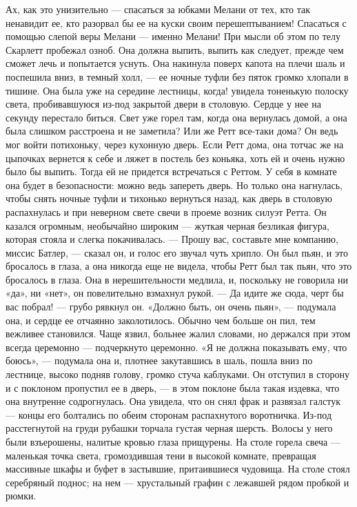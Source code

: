 Ах, как это унизительно — спасаться за юбками Мелани от тех, кто так ненавидит ее, кто разорвал бы ее на куски своим перешептыванием! Спасаться с помощью слепой веры Мелани — именно Мелани!
При мысли об этом по телу Скарлетт пробежал озноб. Она должна выпить, выпить как следует, прежде чем сможет лечь и попытается уснуть. Она накинула поверх капота на плечи шаль и поспешила вниз, в темный холл, — ее ночные туфли без пяток громко хлопали в тишине. Она была уже на середине лестницы, когда! увидела тоненькую полоску света, пробивавшуюся из-под закрытой двери в столовую. Сердце у нее на секунду перестало биться. Свет уже горел там, когда она вернулась домой, а она была слишком расстроена и не заметила? Или же Ретт все-таки дома? Он ведь мог войти потихоньку, через кухонную дверь. Если Ретт дома, она тотчас же на цыпочках вернется к себе и ляжет в постель без коньяка, хоть ей и очень нужно было бы выпить. Тогда ей не придется встречаться с Реттом. У себя в комнате она будет в безопасности: можно ведь запереть дверь.
Но только она нагнулась, чтобы снять ночные туфли и тихонько вернуться назад, как дверь в столовую распахнулась и при неверном свете свечи в проеме возник силуэт Ретта. Он казался огромным, необычайно широким — жуткая черная безликая фигура, которая стояла и слегка покачивалась.
— Прошу вас, составьте мне компанию, миссис Батлер, — сказал он, и голос его звучал чуть хрипло.
Он был пьян, и это бросалось в глаза, а она никогда еще не видела, чтобы Ретт был так пьян, что это бросалось в глаза. Она в нерешительности медлила, и, поскольку не говорила ни «да», ни «нет», он повелительно взмахнул рукой.
— Да идите же сюда, черт бы вас побрал! — грубо рявкнул он.
«Должно быть, он очень пьян», — подумала она, и сердце ее отчаянно заколотилось. Обычно чем больше он пил, тем вежливее становился. Чаще язвил, больнее жалил словами, но держался при этом всегда церемонно — подчеркнуто церемонно.
«Я не должна показывать ему, что боюсь», — подумала она и, плотнее закутавшись в шаль, пошла вниз по лестнице, высоко подняв голову, громко стуча каблуками.
Он отступил в сторону и с поклоном пропустил ее в дверь, — в этом поклоне была такая издевка, что она внутренне содрогнулась. Она увидела, что он снял фрак и развязал галстук — концы его болтались по обеим сторонам распахнутого воротничка. Из-под расстегнутой на груди рубашки торчала густая черная шерсть. Волосы у него были взъерошены, налитые кровью глаза прищурены. На столе горела свеча — маленькая точка света, громоздившая тени в высокой комнате, превращая массивные шкафы и буфет в застывшие, притаившиеся чудовища. На столе стоял серебряный поднос; на нем — хрустальный графин с лежавшей рядом пробкой и рюмки.
